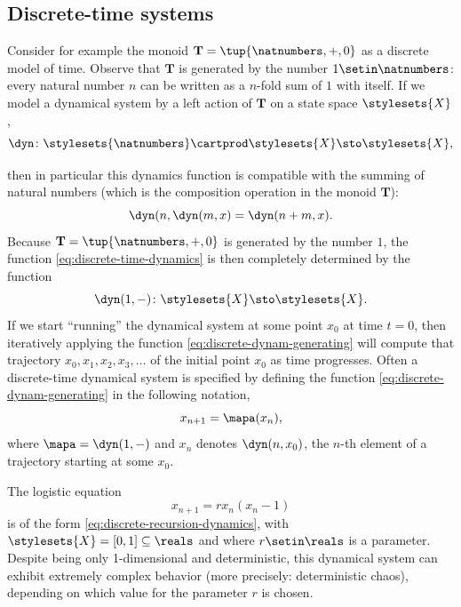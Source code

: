 \subsection{Discrete-time systems}

Consider for example the monoid $\mathbf{T} = \tup{\natnumbers, +, 0}$ as a discrete model of time.
Observe that $\mathbf{T}$ is generated by the number $1 \setin \natnumbers$: every natural number $n$ can be written as a $n$-fold sum of $1$ with itself.
If we model a dynamical system by a left action of $\mathbf{T}$ on a state space $\stylesets{X}$,
\begin{equation}\label{eq:discrete-time-dynamics}
    \dyn \colon  \stylesets{\natnumbers} \cartprod \stylesets{X}   \sto \stylesets{X},
\end{equation}

then in particular this dynamics function is compatible with the summing of natural numbers (which is the composition operation in the monoid $\mathbf{T}$):
\begin{equation}
    \dyn(n, \dyn(m, x) = \dyn(n + m, x).
\end{equation}
Because $\mathbf{T} = \tup{\natnumbers, +, 0}$ is generated by the number $1$, the function \cref{eq:discrete-time-dynamics} is then completely determined by the function
\begin{equation}\label{eq:discrete-dynam-generating}
    \dyn(1, - ) \colon \stylesets{X}   \sto \stylesets{X}.
\end{equation}
If we start ``running'' the dynamical system at some point $x_0$ at time $t = 0$, then iteratively applying the function \cref{eq:discrete-dynam-generating} will compute that trajectory $x_0, x_1, x_2, x_3, \dots$ of the initial point $x_0$ as time progresses.
Often a discrete-time dynamical system is specified by defining the function \cref{eq:discrete-dynam-generating} in the following notation,
\begin{equation}\label{eq:discrete-recursion-dynamics}
    x_{n+1} = \mapa(x_n),
\end{equation}
where $\mapa = \dyn(1, - )$ and $x_n$ denotes $\dyn(n, x_0)$, the $n$-th element of a trajectory starting at some $x_0$.

\begin{example} The logistic equation
    \begin{equation}
        x_{n+1} = rx_n(x_n - 1)
    \end{equation}
    is of the form \cref{eq:discrete-recursion-dynamics}, with $\stylesets{X} = [0,1] \subseteq \reals$ and where $r \setin \reals$ is a parameter.
    Despite being only 1-dimensional and deterministic, this dynamical system can exhibit extremely complex behavior (more precisely: deterministic chaos), depending on which value for the parameter $r$ is chosen.
\end{example}

